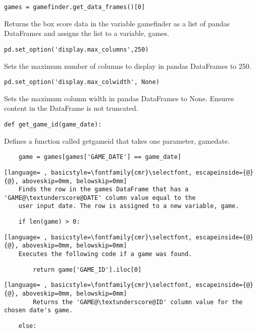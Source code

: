 \documentclass{article}
\begin{document}
\begin{lstlisting}
games = gamefinder.get_data_frames()[0]
\end{lstlisting}
Returns the box score data in the variable gamefinder as a list of pandas DataFrames and assigns the list to a variable, games.
\begin{lstlisting}
pd.set_option('display.max_columns',250)
\end{lstlisting}
Sets the maximum number of columns to display in pandas DataFrames to 250.
\begin{lstlisting}
pd.set_option('display.max_colwidth', None)
\end{lstlisting}
Sets the maximum column width in pandas DataFrames to None. Ensures content in the DataFrame is not truncated.
\begin{lstlisting}
def get_game_id(game_date):
\end{lstlisting}
Defines a function called get\textunderscore game\textunderscore id that takes one parameter, game\textunderscore date.
\begin{lstlisting}
    game = games[games['GAME_DATE'] == game_date]
\end{lstlisting}
\begin{lstlisting}[language= , basicstyle=\fontfamily{cmr}\selectfont, escapeinside={@}{@}, aboveskip=0mm, belowskip=0mm]
    Finds the row in the games DataFrame that has a 'GAME@\textunderscore@DATE' column value equal to the
    user input date. The row is assigned to a new variable, game.
\end{lstlisting}
\begin{lstlisting}
    if len(game) > 0:
\end{lstlisting}
\begin{lstlisting}[language= , basicstyle=\fontfamily{cmr}\selectfont, escapeinside={@}{@}, aboveskip=0mm, belowskip=0mm]
    Executes the following code if a game was found.
\end{lstlisting}
\begin{lstlisting}
        return game['GAME_ID'].iloc[0]
\end{lstlisting}
\begin{lstlisting}[language= , basicstyle=\fontfamily{cmr}\selectfont, escapeinside={@}{@}, aboveskip=0mm, belowskip=0mm]
        Returns the 'GAME@\textunderscore@ID' column value for the chosen date's game.
\end{lstlisting}
\begin{lstlisting}
    else:
\end{lstlisting}
\end{document}
